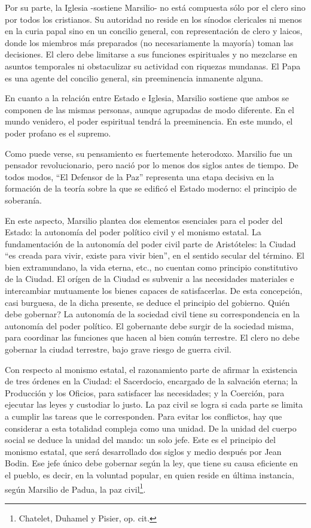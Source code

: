 \documentclass[
]{book}
\begin{document}
Por su parte, la Iglesia -sostiene Marsilio- no está compuesta sólo por el clero sino por todos los cristianos. Su autoridad no reside en los sínodos clericales ni menos en la curia papal sino en un concilio general, con representación de clero y laicos, donde los miembros más preparados (no necesariamente la mayoría) toman las decisiones. El clero debe limitarse a sus funciones espirituales y no mezclarse en asuntos temporales ni obstaculizar su actividad con riquezas mundanas. El Papa es una agente del concilio general, sin preeminencia inmanente alguna.

En cuanto a la relación entre Estado e Iglesia, Marsilio sostiene que ambos se componen de las mismas personas, aunque agrupadas de modo diferente. En el mundo venidero, el poder espiritual tendrá la preeminencia. En este mundo, el poder profano es el supremo.

Como puede verse, su pensamiento es fuertemente heterodoxo. Marsilio fue un pensador revolucionario, pero nació por lo menos dos siglos antes de tiempo. De todos modos, ``El Defensor de la Paz'' representa una etapa decisiva en la formación de la teoría sobre la que se edificó el Estado moderno: el principio de soberanía.

En este aspecto, Marsilio plantea dos elementos esenciales para el poder del Estado: la autonomía del poder político civil y el monismo estatal. La fundamentación de la autonomía del poder civil parte de Aristóteles: la Ciudad ``es creada para vivir, existe para vivir bien'', en el sentido secular del término. El bien extramundano, la vida eterna, etc., no cuentan como principio constitutivo de la Ciudad. El orígen de la Ciudad es subvenir a las necesidades materiales e intercambiar mutuamente los bienes capaces de satisfacerlas. De esta concepción, casi burguesa, de la dicha presente, se deduce el principio del gobierno. Quién debe gobernar? La autonomía de la sociedad civil tiene su correspondencia en la autonomía del poder político. El gobernante debe surgir de la sociedad misma, para coordinar las funciones que hacen al bien común terrestre. El clero no debe gobernar la ciudad terrestre, bajo grave riesgo de guerra civil.

Con respecto al monismo estatal, el razonamiento parte de afirmar la existencia de tres órdenes en la Ciudad: el Sacerdocio, encargado de la salvación eterna; la Producción y los Oficios, para satisfacer las necesidades; y la Coerción, para ejecutar las leyes y custodiar lo justo. La paz civil se logra si cada parte se limita a cumplir las tareas que le corresponden. Para evitar los conflictos, hay que considerar a esta totalidad compleja como una unidad. De la unidad del cuerpo social se deduce la unidad del mando: un solo jefe. Este es el principio del monismo estatal, que será desarrollado dos siglos y medio después por Jean Bodin. Ese jefe único debe gobernar según la ley, que tiene su causa eficiente en el pueblo, es decir, en la voluntad popular, en quien reside en última instancia, según Marsilio de Padua, la paz civil\footnote{Chatelet, Duhamel y Pisier, op. cit.}.
\end{document}
